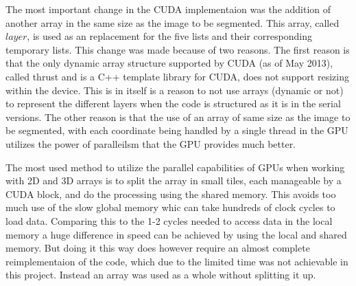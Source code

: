 The most important change in the CUDA implementaion was the addition of another array in the same size as the image to be segmented. This array, called $layer$, is used as an replacement for the five lists and their corresponding temporary lists. This change was made because of two reasons. The first reason is that the only dynamic array structure supported by CUDA (as of May 2013), called thrust and is a C++ template library for CUDA\cite{thrustCuda}, does not support resizing within the device. This is in itself is a reason to not use arrays (dynamic or not) to represent the different layers when the code is structured as it is in the serial versions. The other reason is that the use of an array of same size as the image to be segmented, with each coordinate being handled by a single thread in the GPU utilizes the power of paralleilsm that the GPU provides much better.

The most used method to utilize the parallel capabilities of GPUs when working with 2D and 3D arrays is to split the array in small tiles, each manageable by a CUDA block, and do the processing using the shared memory. This avoids too much use of the slow global memory whic can take hundreds of clock cycles to load data. Comparing this to the 1-2 cycles needed to access data in the local memory a huge difference in speed can be achieved by using the local and shared memory. But doing it this way does however require an almost complete reimplementaion of the code, which due to the limited time was not achievable in this project. Instead an array was used as a whole without splitting it up. 


